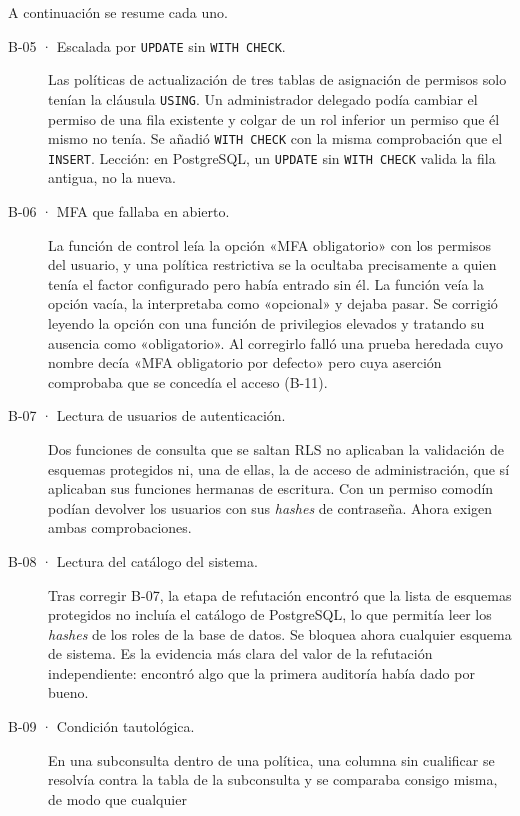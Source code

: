 A continuación se resume cada uno.

\begin{description}
  \item[B-05 · Escalada por \texttt{UPDATE} sin \texttt{WITH CHECK}.] Las
        políticas de actualización de tres tablas de asignación de permisos
        solo tenían la cláusula \texttt{USING}. Un administrador delegado
        podía cambiar el permiso de una fila existente y colgar de un rol
        inferior un permiso que él mismo no tenía. Se añadió \texttt{WITH
        CHECK} con la misma comprobación que el \texttt{INSERT}. Lección: en
        PostgreSQL, un \texttt{UPDATE} sin \texttt{WITH CHECK} valida la fila
        antigua, no la nueva.
  \item[B-06 · MFA que fallaba en abierto.] La función de control leía la
        opción «MFA obligatorio» con los permisos del usuario, y una política
        restrictiva se la ocultaba precisamente a quien tenía el factor
        configurado pero había entrado sin él. La función veía la opción
        vacía, la interpretaba como «opcional» y dejaba pasar. Se corrigió
        leyendo la opción con una función de privilegios elevados y tratando
        su ausencia como «obligatorio». Al corregirlo falló una prueba
        heredada cuyo nombre decía «MFA obligatorio por defecto» pero cuya
        aserción comprobaba que se concedía el acceso (B-11).
  \item[B-07 · Lectura de usuarios de autenticación.] Dos funciones de
        consulta que se saltan RLS no aplicaban la validación de esquemas
        protegidos ni, una de ellas, la de acceso de administración, que sí
        aplicaban sus funciones hermanas de escritura. Con un permiso
        comodín podían devolver los usuarios con sus \textit{hashes} de
        contraseña. Ahora exigen ambas comprobaciones.
  \item[B-08 · Lectura del catálogo del sistema.] Tras corregir B-07, la
        etapa de refutación encontró que la lista de esquemas protegidos no
        incluía el catálogo de PostgreSQL, lo que permitía leer los
        \textit{hashes} de los roles de la base de datos. Se bloquea ahora
        cualquier esquema de sistema. Es la evidencia más clara del valor de
        la refutación independiente: encontró algo que la primera auditoría
        había dado por bueno.
  \item[B-09 · Condición tautológica.] En una subconsulta dentro de una
        política, una columna sin cualificar se resolvía contra la tabla de
        la subconsulta y se comparaba consigo misma, de modo que cualquier

\end{description}
